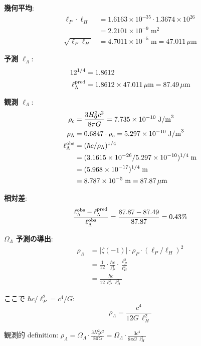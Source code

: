 \documentclass[11pt,a4paper]{article}
\begin{document}
\textbf{幾何平均}:
\begin{align}
\ell_P\cdot\ell_H &= 1.6163\times 10^{-35}\cdot 1.3674\times 10^{26}\\
&= 2.2101\times 10^{-9}\;\text{m}^2\\
\sqrt{\ell_P\ell_H} &= 4.7011\times 10^{-5}\;\text{m} = 47.011\,\mu\text{m}
\end{align}

\textbf{予測 $\ell_\Lambda$}:
\begin{align}
12^{1/4} &= 1.8612\\
\ell_\Lambda^{\rm pred} &= 1.8612\times 47.011\,\mu\text{m} = 87.49\,\mu\text{m}
\end{align}

\textbf{観測 $\ell_\Lambda$}:
\begin{align}
\rho_c &= \frac{3H_0^2c^2}{8\pi G} = 7.735\times 10^{-10}\;\text{J/m}^3\\
\rho_\Lambda &= 0.6847\cdot\rho_c = 5.297\times 10^{-10}\;\text{J/m}^3\\
\ell_\Lambda^{\rm obs} &= (\hbar c/\rho_\Lambda)^{1/4}\\
&= (3.1615\times 10^{-26}/5.297\times 10^{-10})^{1/4}\;\text{m}\\
&= (5.968\times 10^{-17})^{1/4}\;\text{m}\\
&= 8.787\times 10^{-5}\;\text{m} = 87.87\,\mu\text{m}
\end{align}

\textbf{相対差}:
\begin{equation}
\frac{\ell_\Lambda^{\rm obs} - \ell_\Lambda^{\rm pred}}{\ell_\Lambda^{\rm obs}}
= \frac{87.87 - 87.49}{87.87} = 0.43\%
\end{equation}

\textbf{$\Omega_\Lambda$ 予測の導出}:
\begin{align}
\rho_\Lambda &= |\zeta(-1)|\cdot\rho_P\cdot(\ell_P/\ell_H)^2\\
&= \frac{1}{12}\cdot\frac{\hbar c}{\ell_P^4}\cdot\frac{\ell_P^2}{\ell_H^2}\\
&= \frac{\hbar c}{12\,\ell_P^2\,\ell_H^2}
\end{align}

ここで $\hbar c/\ell_P^2 = c^4/G$:
\begin{equation}
\rho_\Lambda = \frac{c^4}{12 G\,\ell_H^2}
\end{equation}

観測的 definition: $\rho_\Lambda = \Omega_\Lambda\cdot\frac{3H_0^2 c^2}{8\pi G} = \Omega_\Lambda\cdot\frac{3c^4}{8\pi G\,\ell_H^2}$
\end{document}
